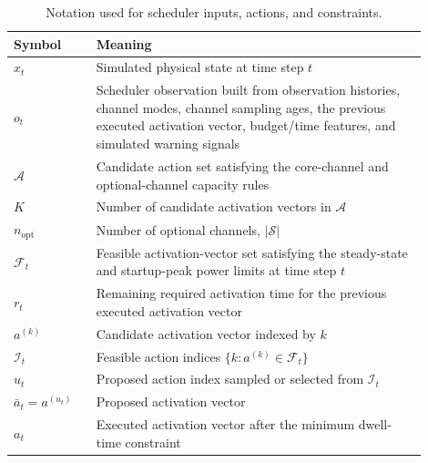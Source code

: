 \begin{table}[htbp]
  \centering
  \caption{Notation used for scheduler inputs, actions, and constraints.}
  \label{tab:notation_summary}
  \footnotesize
  \setlength{\tabcolsep}{4pt}
  \begin{tabular}{@{}p{0.18\linewidth}p{0.72\linewidth}@{}}
    \toprule
    Symbol & Meaning \\
    \midrule
    $x_t$ & Simulated physical state at time step $t$ \\
    $o_t$ & Scheduler observation built from observation histories, channel modes, channel sampling ages, the previous executed activation vector, budget/time features, and simulated warning signals \\
    $\mathcal{A}$ & Candidate action set satisfying the core-channel and optional-channel capacity rules \\
    $K$ & Number of candidate activation vectors in $\mathcal{A}$ \\
    $n_{\mathrm{opt}}$ & Number of optional channels, $|\mathcal{S}|$ \\
    $\mathcal{F}_t$ & Feasible activation-vector set satisfying the steady-state and startup-peak power limits at time step $t$ \\
    $r_t$ & Remaining required activation time for the previous executed activation vector \\
    $a^{(k)}$ & Candidate activation vector indexed by $k$ \\
    $\mathcal{I}_t$ & Feasible action indices $\{k:a^{(k)}\in\mathcal{F}_t\}$ \\
    $u_t$ & Proposed action index sampled or selected from $\mathcal{I}_t$ \\
    $\bar a_t=a^{(u_t)}$ & Proposed activation vector \\
    $a_t$ & Executed activation vector after the minimum dwell-time constraint \\
    \bottomrule
  \end{tabular}
\end{table}

